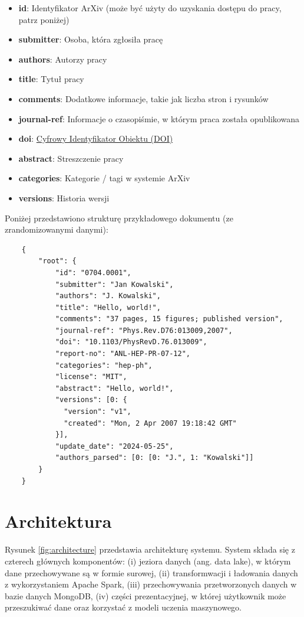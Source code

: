 \documentclass[10pt]{article}
\begin{document}
\begin{itemize}
    \item \textbf{id}: Identyfikator ArXiv (może być użyty do uzyskania dostępu do pracy, patrz poniżej)
    \item \textbf{submitter}: Osoba, która zgłosiła pracę
    \item \textbf{authors}: Autorzy pracy
    \item \textbf{title}: Tytuł pracy
    \item \textbf{comments}: Dodatkowe informacje, takie jak liczba stron i rysunków
    \item \textbf{journal-ref}: Informacje o czasopiśmie, w którym praca została opublikowana
    \item \textbf{doi}: \href{https://www.doi.org}{Cyfrowy Identyfikator Obiektu (DOI)}
    \item \textbf{abstract}: Streszczenie pracy
    \item \textbf{categories}: Kategorie / tagi w systemie ArXiv
    \item \textbf{versions}: Historia wersji
\end{itemize}

Poniżej przedstawiono strukturę przykładowego dokumentu (ze zrandomizowanymi danymi):
\begin{lstlisting}
    {
        "root": {
            "id": "0704.0001",
            "submitter": "Jan Kowalski",
            "authors": "J. Kowalski",
            "title": "Hello, world!",
            "comments": "37 pages, 15 figures; published version",
            "journal-ref": "Phys.Rev.D76:013009,2007",
            "doi": "10.1103/PhysRevD.76.013009",
            "report-no": "ANL-HEP-PR-07-12",
            "categories": "hep-ph",
            "license": "MIT",
            "abstract": "Hello, world!",
            "versions": [0: {
              "version": "v1",
              "created": "Mon, 2 Apr 2007 19:18:42 GMT"
            }],
            "update_date": "2024-05-25",
            "authors_parsed": [0: [0: "J.", 1: "Kowalski"]]
        }
    }
\end{lstlisting}

\section{Architektura}

Rysunek \ref{fig:architecture} przedstawia architekturę systemu. System składa się z czterech głównych komponentów: (i) jeziora danych (ang. data lake), w którym dane przechowywane są w formie surowej, (ii) transformwacji i ładowania danych z wykorzystaniem Apache Spark, (iii) przechowywania przetworzonych danych w bazie danych MongoDB, (iv) części prezentacyjnej, w której użytkownik może przeszukiwać dane oraz korzystać z modeli uczenia maszynowego.
\end{document}

